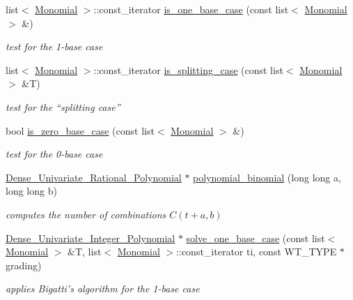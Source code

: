 \begin{DoxyCompactItemize}
list$<$ \hyperlink{group__polygroup_class_monomial}{Monomial} $>$\+::const\+\_\+iterator \hyperlink{group__commalg_gaed5cfd21d305dfc0d912bab347a82f65}{is\+\_\+one\+\_\+base\+\_\+case} (const list$<$ \hyperlink{group__polygroup_class_monomial}{Monomial} $>$ \&)
\begin{DoxyCompactList}\small\item\em test for the 1-\/base case \cite{Bigatti97} \end{DoxyCompactList}\item 
list$<$ \hyperlink{group__polygroup_class_monomial}{Monomial} $>$\+::const\+\_\+iterator \hyperlink{group__commalg_ga26c5ece1df1c4db4873925f41ed8ee9c}{is\+\_\+splitting\+\_\+case} (const list$<$ \hyperlink{group__polygroup_class_monomial}{Monomial} $>$ \&T)
\begin{DoxyCompactList}\small\item\em test for the ``splitting case'' \cite{Bigatti97} \end{DoxyCompactList}\item 
bool \hyperlink{group__commalg_gabf201296cecf6c31675c7e23bb58dbb4}{is\+\_\+zero\+\_\+base\+\_\+case} (const list$<$ \hyperlink{group__polygroup_class_monomial}{Monomial} $>$ \&)
\begin{DoxyCompactList}\small\item\em test for the 0-\/base case \cite{Bigatti97} \end{DoxyCompactList}\item 
\hyperlink{group__polygroup_class_dense___univariate___rational___polynomial}{Dense\+\_\+\+Univariate\+\_\+\+Rational\+\_\+\+Polynomial} $\ast$ \hyperlink{group__commalg_ga185ac534295dffe04f9af3e235e1d44a}{polynomial\+\_\+binomial} (long long a, long long b)
\begin{DoxyCompactList}\small\item\em computes the number of combinations $C(t+a,b)$ \end{DoxyCompactList}\item 
\hyperlink{group__polygroup_class_dense___univariate___integer___polynomial}{Dense\+\_\+\+Univariate\+\_\+\+Integer\+\_\+\+Polynomial} $\ast$ \hyperlink{group__commalg_ga806777263a7836e3dabc0349440c47db}{solve\+\_\+one\+\_\+base\+\_\+case} (const list$<$ \hyperlink{group__polygroup_class_monomial}{Monomial} $>$ \&T, list$<$ \hyperlink{group__polygroup_class_monomial}{Monomial} $>$\+::const\+\_\+iterator ti, const W\+T\+\_\+\+T\+Y\+PE $\ast$grading)
\begin{DoxyCompactList}\small\item\em applies Bigatti's algorithm for the 1-\/base case \end{DoxyCompactList}\item 

\end{DoxyCompactItemize}
